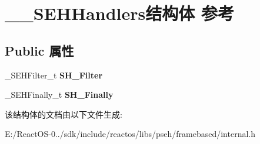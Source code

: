 \hypertarget{struct_____s_e_h_handlers}{}\section{\+\_\+\+\_\+\+S\+E\+H\+Handlers结构体 参考}
\label{struct_____s_e_h_handlers}
\subsection*{Public 属性}
\begin{DoxyCompactItemize}
\item 
\mbox{\label{struct_____s_e_h_handlers_a22d022d87f59eb5ec0f52e0a4a433df4}} 
\+\_\+\+S\+E\+H\+Filter\+\_\+t {\bfseries S\+H\+\_\+\+Filter}
\item 
\mbox{\label{struct_____s_e_h_handlers_a43de9fba6b964758083d49fcab196ddd}} 
\+\_\+\+S\+E\+H\+Finally\+\_\+t {\bfseries S\+H\+\_\+\+Finally}
\end{DoxyCompactItemize}


该结构体的文档由以下文件生成\+:\begin{DoxyCompactItemize}
\item 
E\+:/\+React\+O\+S-\/0../sdk/include/reactos/libs/pseh/framebased/internal.\+h\end{DoxyCompactItemize}
